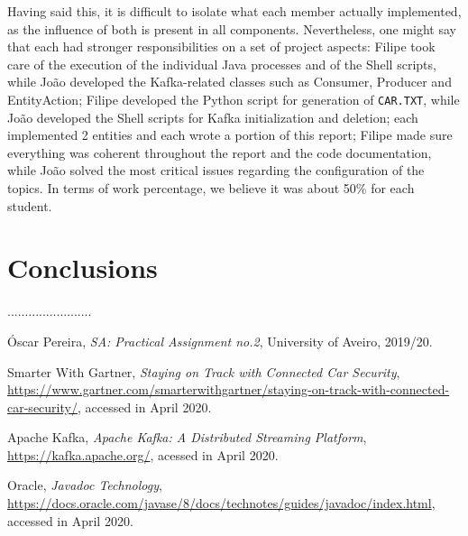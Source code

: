 \documentclass[12pt]{article}
\begin{document}
Having said this, it is difficult to isolate what each member actually implemented, as the influence of both is present in all components.
Nevertheless, one might say that each had stronger responsibilities on a set of project aspects:
Filipe took care of the execution of the individual Java processes and of the Shell scripts, while João developed the Kafka-related classes such as Consumer,
Producer and EntityAction; Filipe developed the Python script for generation of \texttt{CAR.TXT}, while João developed the Shell scripts for Kafka initialization 
and deletion; each implemented 2 entities and each wrote a portion of this report; Filipe made sure everything was coherent throughout the report and the code 
documentation, while João solved the most critical issues regarding the configuration of the topics.
In terms of work percentage, we believe it was about 50\% for each student.

\newpage
\section*{Conclusions} %

........................

\begin{thebibliography}{9} %
  

    Óscar Pereira,
    \textit{SA: Practical Assignment no.2},
    University of Aveiro,
    2019/20.
  
    Smarter With Gartner,
    \textit{Staying on Track with Connected Car Security},
    \url{https://www.gartner.com/smarterwithgartner/staying-on-track-with-connected-car-security/},
    accessed in April 2020.

    Apache Kafka,
    \textit{Apache Kafka: A Distributed Streaming Platform},
    \url{https://kafka.apache.org/},
    acessed in April 2020.

    Oracle,
    \textit{Javadoc Technology},
    \url{https://docs.oracle.com/javase/8/docs/technotes/guides/javadoc/index.html},
    accessed in April 2020.


    
 

\end{thebibliography}

\clearpage
\end{document}
